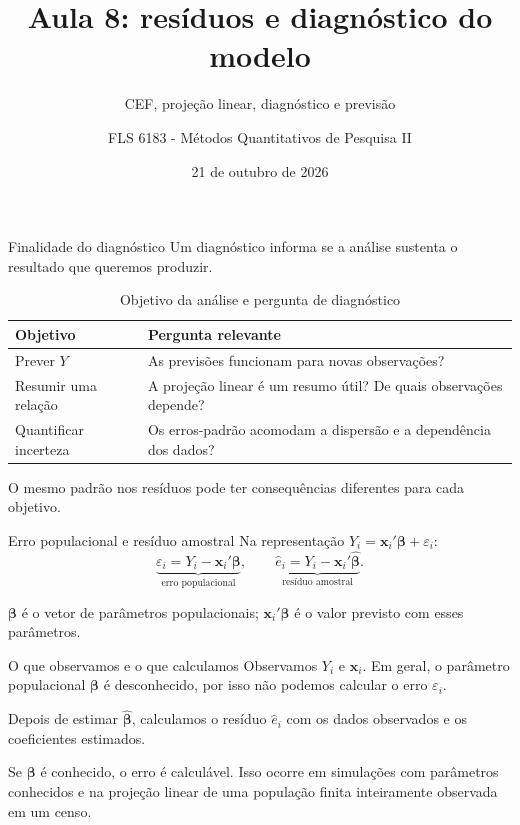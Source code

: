 \documentclass[
  ignorenonframetext,
  brazilian,
  aspectratio=169,
  10pt]{beamer}
\title{Aula 8: resíduos e diagnóstico do modelo}
\subtitle{CEF, projeção linear, diagnóstico e previsão}
\author{FLS 6183 - Métodos Quantitativos de Pesquisa II}
\date{21 de outubro de 2026}
\begin{document}
\frame{\titlepage}

\begin{frame}{Finalidade do diagnóstico}
\protect{}\label{finalidade-do-diagnuxf3stico}
Um diagnóstico informa se a análise sustenta o resultado que queremos
produzir.

\begin{table}
\centering
\caption{Objetivo da análise e pergunta de diagnóstico}
\begin{tabular}{p{}p{}}
\toprule
Objetivo & Pergunta relevante \\
\midrule
Prever $Y$ & As previsões funcionam para novas observações? \\
Resumir uma relação & A projeção linear é um resumo útil? De quais observações depende? \\
Quantificar incerteza & Os erros-padrão acomodam a dispersão e a dependência dos dados? \\
\bottomrule
\end{tabular}
\end{table}

O mesmo padrão nos resíduos pode ter consequências diferentes para cada
objetivo.
\end{frame}

\begin{frame}{Erro populacional e resíduo amostral}
\protect{}\label{erro-populacional-e-resuxedduo-amostral}
Na representação \(Y_i=\mathbf x_i'\boldsymbol\beta+\varepsilon_i\): \[
\underbrace{\varepsilon_i=Y_i-\mathbf x_i'\boldsymbol\beta}_{\text{erro populacional}},
\qquad
\underbrace{\hat e_i=Y_i-\mathbf x_i'\widehat{\boldsymbol\beta}}_{\text{resíduo amostral}}.
\]

\(\boldsymbol\beta\) é o vetor de parâmetros populacionais;
\(\mathbf x_i'\boldsymbol\beta\) é o valor previsto com esses
parâmetros.

\begin{block}{O que observamos e o que calculamos}
Observamos $Y_i$ e $\mathbf x_i$. Em geral, o parâmetro populacional $\boldsymbol\beta$ é desconhecido, por isso não podemos calcular o erro $\varepsilon_i$.

Depois de estimar $\widehat{\boldsymbol\beta}$, calculamos o resíduo $\hat e_i$ com os dados observados e os coeficientes estimados.
\end{block}

Se \(\boldsymbol\beta\) é conhecido, o erro é calculável. Isso ocorre em
simulações com parâmetros conhecidos e na projeção linear de uma
população finita inteiramente observada em um censo.
\end{frame}
\end{document}

